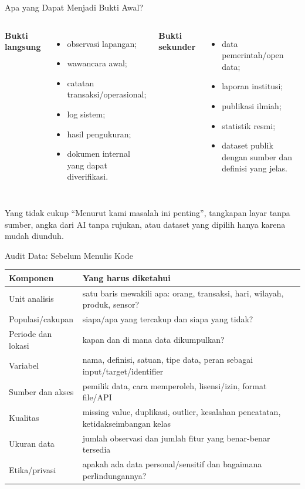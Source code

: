 \documentclass[aspectratio=169,11pt]{beamer}
\begin{document}
\begin{frame}{Apa yang Dapat Menjadi Bukti Awal?}
\small
\begin{columns}[T]
\textbf{Bukti langsung}
\begin{itemize}
  \item observasi lapangan;
  \item wawancara awal;
  \item catatan transaksi/operasional;
  \item log sistem;
  \item hasil pengukuran;
  \item dokumen internal yang dapat diverifikasi.
\end{itemize}

\textbf{Bukti sekunder}
\begin{itemize}
  \item data pemerintah/open data;
  \item laporan institusi;
  \item publikasi ilmiah;
  \item statistik resmi;
  \item dataset publik dengan sumber dan definisi yang jelas.
\end{itemize}
\end{columns}

\begin{block}{Yang tidak cukup}
\footnotesize
``Menurut kami masalah ini penting'', tangkapan layar tanpa sumber, angka dari AI tanpa rujukan, atau dataset yang dipilih hanya karena mudah diunduh.
\end{block}
\end{frame}

\begin{frame}{Audit Data: Sebelum Menulis Kode}
\scriptsize
\begin{center}
\begin{tabular}{p{3.0cm} p{10.1cm}}
\toprule
\textbf{Komponen} & \textbf{Yang harus diketahui} \\
\midrule
Unit analisis & satu baris mewakili apa: orang, transaksi, hari, wilayah, produk, sensor? \\
Populasi/cakupan & siapa/apa yang tercakup dan siapa yang tidak? \\
Periode dan lokasi & kapan dan di mana data dikumpulkan? \\
Variabel & nama, definisi, satuan, tipe data, peran sebagai input/target/identifier \\
Sumber dan akses & pemilik data, cara memperoleh, lisensi/izin, format file/API \\
Kualitas & missing value, duplikasi, outlier, kesalahan pencatatan, ketidakseimbangan kelas \\
Ukuran data & jumlah observasi dan jumlah fitur yang benar-benar tersedia \\
Etika/privasi & apakah ada data personal/sensitif dan bagaimana perlindungannya? \\
\bottomrule
\end{tabular}
\end{center}
\end{frame}
\end{document}
